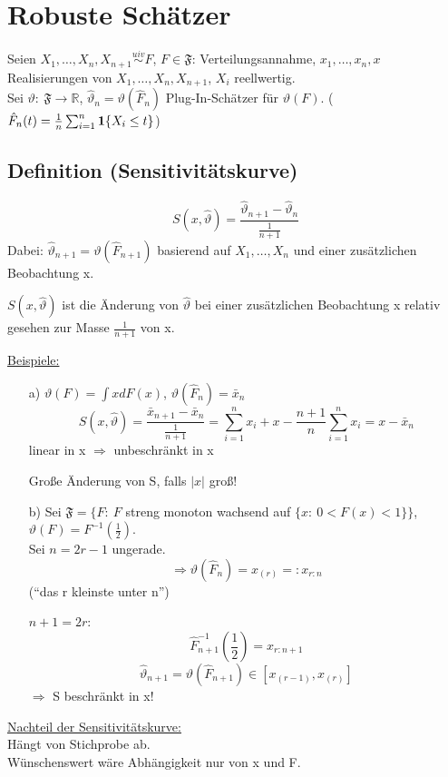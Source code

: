 \documentclass[a4paper,11pt,twoside,titlepage]{article}
\newcommand{\R}{{\mathbb R}}
\newcommand\FF{ \mathfrak{F} }
\newcommand{\ind}{\text{\bf{1}}} %
\newcommand{\uiv}{\ensuremath{\stackrel{uiv}{\sim}}}
\begin{document}
\cleardoublepage
\section{Robuste Schätzer}
Seien $X_1,\ldots,X_n,X_{n+1}\uiv F$, $F\in\FF$: Verteilungsannahme, $x_1,\ldots,x_n,x$ Realisierungen von $X_1,\ldots,X_n,X_{n+1}$, $X_i$ reellwertig.\\
Sei $\vartheta:\ \FF\to\R$, $\hat \vartheta_n=\vartheta(\hat F_n)$ Plug-In-Schätzer für $\vartheta(F)$.\newline
($\hat F_n(t)=\frac1n\sum_{i=1}^n\ind\{X_i\leq t\}$)

\subsection{Definition \textnormal{(Sensitivitätskurve)}}
\[S(x,\hat\vartheta)=\frac{\hat\vartheta_{n+1}-\hat\vartheta_n}{\frac{1}{n+1}}\]
Dabei: $\hat\vartheta_{n+1}=\vartheta(\hat F_{n+1})$ basierend auf $X_1,\ldots,X_n$ und einer zusätzlichen Beobachtung x.

$S(x,\hat\vartheta)$ ist die Änderung von $\hat\vartheta$ bei einer zusätzlichen Beobachtung x relativ gesehen zur Masse $\frac{1}{n+1}$ von x.

\underline{Beispiele:}
\begin{itemize}
\item[a)] $\vartheta(F)=\int xdF(x)$, $\vartheta(\hat F_n)=\bar x_n$
\[S(x,\hat\vartheta)=\frac{\bar x_{n+1}-\bar x_n}{\frac{1}{n+1}}=\sum_{i=1}^n x_i+x-\frac{n+1}{n}\sum_{i=1}^n x_i=x-\bar x_n\]
linear in x $\Rightarrow$ unbeschränkt in x

Große Änderung von S, falls $|x|$ groß!
\item[b)] Sei $\FF=\{F:\ F$ streng monoton wachsend auf $\{x:\ 0<F(x)<1\}\}$, $\vartheta(F)=F^{-1}(\frac12)$.\\
Sei $n=2r-1$ ungerade.
\[\Rightarrow \vartheta(\hat F_n)=x_{(r)}=:x_{r:n}\]
("`das r kleinste unter n"')

$n+1=2r$:
\[\hat F_{n+1}^{-1}(\frac12)=x_{r:n+1}\]
\[\hat\vartheta_{n+1}=\vartheta(\hat F_{n+1})\in[x_{(r-1)},x_{(r)}]\]
$\Rightarrow$ S beschränkt in x!
\end{itemize}

\underline{Nachteil der Sensitivitätskurve:}\\
Hängt von Stichprobe ab.\\
Wünschenswert wäre Abhängigkeit nur von x und F.
\end{document}
